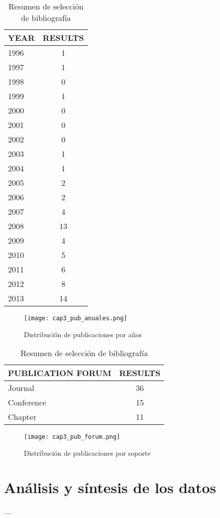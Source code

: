 \begin{table}[H]
  \begin{center}
  \begin{tabular}{| m{4cm} | c |}
    \hline
    YEAR & RESULTS\\
    \hline
    \hline 
    1996 & 1\\
    \hline
    1997 & 1\\
    \hline
    1998 & 0\\
    \hline
    1999 & 1\\
    \hline
    2000 & 0\\
    \hline
    2001 & 0\\
    \hline
    2002 & 0\\
    \hline
    2003 & 1\\
    \hline
    2004 & 1\\
    \hline
    2005 & 2\\
    \hline
    2006 & 2\\
    \hline
    2007 & 4\\
    \hline
    2008 & 13\\
    \hline
    2009 & 4\\
    \hline
    2010 & 5\\
    \hline
    2011 & 6\\
    \hline
    2012 & 8\\
    \hline
    2013 & 14 \\
    \hline
  \end{tabular}
\end{center}
\caption{Resumen de selección de bibliografía}
\label{tab:ResumenAniosResultados}
\end{table} 

\begin{figure}[H]
  \begin{center}
    \texttt{[image: cap3\_pub\_anuales.png]}
  \end{center}
  \caption{Distribución de publicaciones por años}
  \label{fig:PublicacionesAnuales}
\end{figure}

\begin{table}[H]
  \begin{center}
  \begin{tabular}{| m{4cm} | c |}
    \hline
    PUBLICATION FORUM & RESULTS\\
    \hline
    \hline 
    Journal & 36 \\
    \hline
    Conference & 15 \\
    \hline
    Chapter & 11 \\
    \hline
  \end{tabular}
\end{center}
\caption{Resumen de selección de bibliografía}
\label{tab:ResumenForumResultados}
\end{table} 

\begin{figure}[H]
  \begin{center}
    \texttt{[image: cap3\_pub\_forum.png]}
  \end{center}
  \caption{Distribución de publicaciones por soporte}
  \label{fig:PublicacionesForum}
\end{figure}



\section{Análisis y síntesis de los datos}

....
